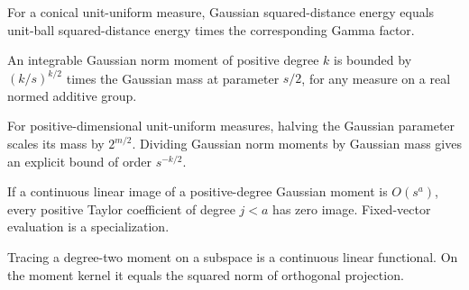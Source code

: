 \begin{lemma}
\label{lem:conical-gaussian-ball-energy}

For a conical unit-uniform measure, Gaussian squared-distance energy equals unit-ball squared-distance energy times the corresponding Gamma factor.
\end{lemma}

\begin{lemma}
\label{lem:gaussian-norm-half-mass}

An integrable Gaussian norm moment of positive degree $k$ is bounded by $(k/s)^{k/2}$ times the Gaussian mass at parameter $s/2$, for any measure on a real normed additive group.
\end{lemma}

\begin{lemma}
\label{lem:uniform-normalized-gaussian-norm}

For positive-dimensional unit-uniform measures, halving the Gaussian parameter scales its mass by $2^{m/2}$. Dividing Gaussian norm moments by Gaussian mass gives an explicit bound of order $s^{-k/2}$.
\end{lemma}

\begin{lemma}
\label{lem:moment-coefficient-growth-images}

If a continuous linear image of a positive-degree Gaussian moment is $O(s^a)$, every positive Taylor coefficient of degree $j<a$ has zero image. Fixed-vector evaluation is a specialization.
\end{lemma}

\begin{lemma}
\label{lem:subspace-moment-trace}

Tracing a degree-two moment on a subspace is a continuous linear functional. On the moment kernel it equals the squared norm of orthogonal projection.
\end{lemma}

